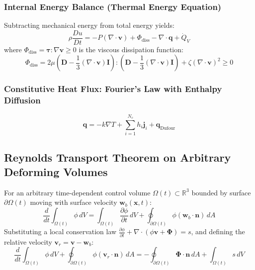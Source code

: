 \documentclass[11pt,a4paper]{article}
\begin{document}
\subsubsection{Internal Energy Balance (Thermal Energy Equation)}
Subtracting mechanical energy from total energy yields:
\begin{equation}
\rho \frac{Du}{Dt} = -P (\nabla \cdot \mathbf{v}) + \Phi_{\text{diss}} - \nabla \cdot \mathbf{q} + \dot{Q}_V
\end{equation}
where $\Phi_{\text{diss}} = \boldsymbol{\tau} : \nabla \mathbf{v} \ge 0$ is the viscous dissipation function:
\begin{equation}
\Phi_{\text{diss}} = 2\mu \left( \mathbf{D} - \frac{1}{3}(\nabla \cdot \mathbf{v})\mathbf{I} \right) : \left( \mathbf{D} - \frac{1}{3}(\nabla \cdot \mathbf{v})\mathbf{I} \right) + \zeta (\nabla \cdot \mathbf{v})^2 \ge 0
\end{equation}

\subsubsection{Constitutive Heat Flux: Fourier's Law with Enthalpy Diffusion}
\begin{equation}
\mathbf{q} = -k \nabla T + \sum_{i=1}^{N_c} h_i \mathbf{j}_i + \mathbf{q}_{\text{Dufour}}
\end{equation}

\subsection{Reynolds Transport Theorem on Arbitrary Deforming Volumes}

For an arbitrary time-dependent control volume $\Omega(t) \subset \mathbb{R}^3$ bounded by surface $\partial \Omega(t)$ moving with surface velocity $\mathbf{w}_b(\mathbf{x}, t)$:
\begin{equation}
\frac{d}{dt} \int_{\Omega(t)} \phi \, dV = \int_{\Omega(t)} \frac{\partial \phi}{\partial t} \, dV + \oint_{\partial \Omega(t)} \phi (\mathbf{w}_b \cdot \mathbf{n}) \, dA
\end{equation}
Substituting a local conservation law $\frac{\partial \phi}{\partial t} + \nabla \cdot (\phi \mathbf{v} + \mathbf{\Phi}) = s$, and defining the relative velocity $\mathbf{v}_r = \mathbf{v} - \mathbf{w}_b$:
\begin{equation}
\frac{d}{dt} \int_{\Omega(t)} \phi \, dV + \oint_{\partial \Omega(t)} \phi (\mathbf{v}_r \cdot \mathbf{n}) \, dA = -\oint_{\partial \Omega(t)} \mathbf{\Phi} \cdot \mathbf{n} \, dA + \int_{\Omega(t)} s \, dV
\end{equation}
\end{document}
